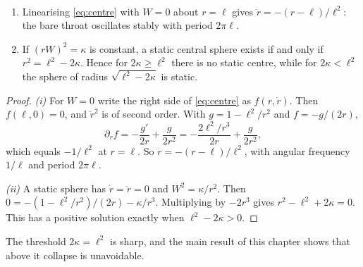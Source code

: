 \begin{proposition}\label{prop:centrestatic}\ver\
\begin{enumerate}[label=(\roman*)]
\item Linearising \eqref{eq:centre} with $W=0$ about $r=\ell$ gives $\ddot r=-(r-\ell)/\ell^2$: the bare throat oscillates stably with period $2\pi\ell$.
\item If $(rW)^2=\kappa$ is constant, a static central sphere exists if and only if $r^2=\ell^2-2\kappa$. Hence for $2\kappa\ge\ell^2$ there is no static centre, while for $2\kappa<\ell^2$ the sphere of radius $\sqrt{\ell^2-2\kappa}$ is static.
\end{enumerate}
\end{proposition}
\begin{proof}
\emph{(i)} For $W=0$ write the right side of \eqref{eq:centre} as $f(r,\dot r)$. Then $f(\ell,0)=0$, and $\dot r^2$ is of second order. With $g=1-\ell^2/r^2$ and $f=-g/(2r)$,
\[
\partial_rf=-\frac{g'}{2r}+\frac g{2r^2}=-\frac{2\ell^2/r^3}{2r}+\frac g{2r^2},
\]
which equals $-1/\ell^2$ at $r=\ell$. So $\ddot r=-(r-\ell)/\ell^2$, with angular frequency $1/\ell$ and period $2\pi\ell$.

\emph{(ii)} A static sphere has $\dot r=\ddot r=0$ and $W^2=\kappa/r^2$. Then $0=-(1-\ell^2/r^2)/(2r)-\kappa/r^3$. Multiplying by $-2r^3$ gives $r^2-\ell^2+2\kappa=0$. This has a positive solution exactly when $\ell^2-2\kappa>0$.
\end{proof}


The threshold $2\kappa=\ell^2$ is sharp, and the main result of this chapter shows that above it collapse is unavoidable.

